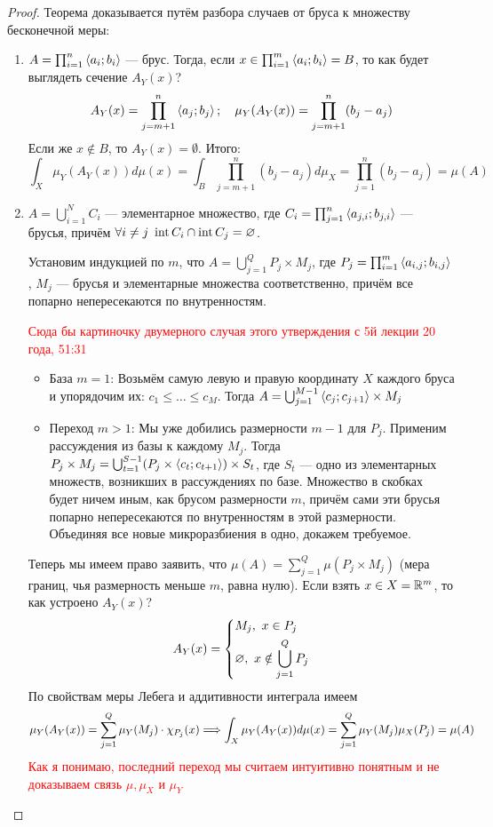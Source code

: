 \begin{proof}
	Теорема доказывается путём разбора случаев от бруса к множеству бесконечной меры:
	\begin{enumerate}
		\item $A = \prod_{i = 1}^n \left\langle a_i; b_i\right\rangle$ --- брус. Тогда, если $x \in \prod_{i = 1}^m \left\langle a_i; b_i\right\rangle = B$, то как будет выглядеть сечение $A_Y(x)$?
		\[
			A_Y(x) = \prod_{j = m + 1}^n \left\langle a_j; b_j\right\rangle;\ \ \ \mu_Y(A_Y(x)) = \prod_{j = m + 1}^n (b_j - a_j)
		\]
		Если же $x \notin B$, то $A_Y(x) = \emptyset$. Итого:
		\[
			\int_X \mu_Y(A_Y(x))d\mu(x) = \int_{B} \prod_{j = m + 1}^n (b_j - a_j)d\mu_X = \prod_{j = 1}^n (b_j - a_j) = \mu(A)
		\]
		
		\item $A = \bigcup_{i = 1}^N C_i$ --- элементарное множество, где $C_i = \prod_{j = 1}^n \left\langle a_{j, i}; b_{j, i}\right\rangle$ --- брусья, причём $\forall i \neq j\ \operatorname{int} C_i \cap \operatorname{int} C_j = \varnothing$.
		
		Установим индукцией по $m$, что $A = \bigcup_{j = 1}^Q P_j \times M_j$, где $P_j = \prod_{i = 1}^m \left\langle a_{i, j}; b_{i, j}\right\rangle$, $M_j$ --- брусья и элементарные множества соответственно, причём все попарно непересекаются по внутренностям.
		
		\textcolor{red}{Сюда бы картиночку двумерного случая этого утверждения с 5й лекции 20 года, 51:31}
		
		\begin{itemize}
			\item База $m = 1$: Возьмём самую левую и правую координату $X$ каждого бруса и упорядочим их: $c_1 \le \ldots \le c_M$. Тогда $A = \bigcup_{j = 1}^{M - 1} \left\langle c_j; c_{j + 1}\right\rangle \times M_j$
			
			\item Переход $m > 1$: Мы уже добились размерности $m - 1$ для $P_j$. Применим рассуждения из базы к каждому $M_j$. Тогда $P_j \times M_j = \bigcup_{t = 1}^{S - 1} (P_j \times \left\langle c_t; c_{t + 1}\right\rangle) \times S_t$, где $S_t$ --- одно из элементарных множеств, возникших в рассуждениях по базе. Множество в скобках будет ничем иным, как брусом размерности $m$, причём сами эти брусья попарно непересекаются по внутренностям в этой размерности. Объединяя все новые микроразбиения в одно, докажем требуемое.
		\end{itemize}
		Теперь мы имеем право заявить, что $\mu(A) = \sum_{j = 1}^Q \mu(P_j \times M_j)$ (мера границ, чья размерность меньше $m$, равна нулю). Если взять $x \in X = \mathbb{R}^m$, то как устроено $A_Y(x)$?
		\[
			A_Y(x) = \left\{ \begin{aligned} 
				&{M_j,\ x \in P_j}
				\\
				&{\varnothing,\ x \notin \bigcup_{j = 1}^Q P_j}
			 \end{aligned} \right.
		\]
		По свойствам меры Лебега и аддитивности интеграла имеем
		\[
			\mu_Y(A_Y(x)) = \sum_{j = 1}^Q \mu_Y(M_j) \cdot \chi_{P_j}(x) \Longrightarrow \int_X \mu_Y(A_Y(x)) d\mu(x) = \sum_{j = 1}^Q \mu_Y(M_j) \mu_X(P_j) = \mu(A)
		\]
		\textcolor{red}{Как я понимаю, последний переход мы считаем интуитивно понятным и не доказываем связь $\mu, \mu_X$ и $\mu_Y$}
		

\end{enumerate}
\end{proof}

